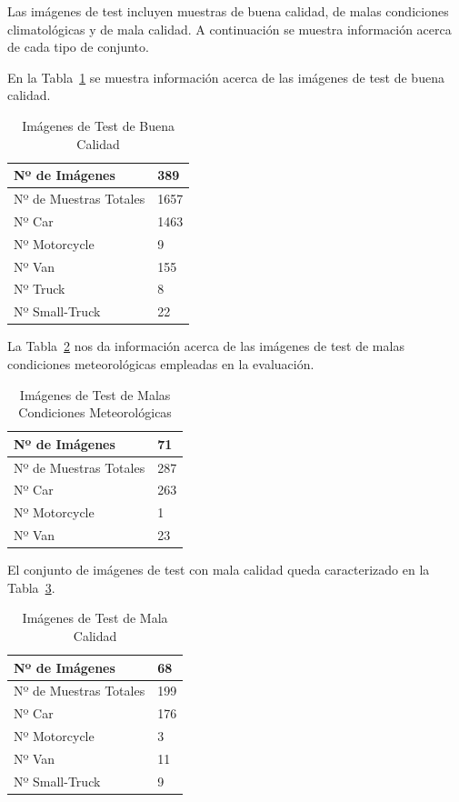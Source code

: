 Las imágenes de test incluyen muestras de buena calidad, de malas condiciones climatológicas y de mala calidad. A continuación se muestra información acerca de cada tipo de conjunto.

En la Tabla~\ref{tab_img_test_buenas} se muestra información acerca de las imágenes de test de buena calidad.
\begin{table}[H] 
\begin{center}
\begin{tabular}{|l|l|}
\hline
Nº de Imágenes  & 389 \\
\hline \hline
Nº de Muestras Totales & 1657\\ \hline
Nº Car & 1463 \\ \hline
Nº Motorcycle & 9 \\ \hline
Nº Van & 155 \\ \hline
Nº Truck & 8 \\ \hline
Nº Small-Truck & 22 \\ \hline
\end{tabular}
\caption{Imágenes de Test de Buena Calidad}
\label{tab_img_test_buenas}
\end{center}
\end{table}

La Tabla~\ref{tab_img_test_malas_condiciones} nos da información acerca de las imágenes de test de malas condiciones meteorológicas empleadas en la evaluación.
\begin{table}[H] 
\begin{center}
\begin{tabular}{|l|l|}
\hline
Nº de Imágenes  & 71 \\
\hline \hline
Nº de Muestras Totales & 287\\ \hline
Nº Car & 263 \\ \hline
Nº Motorcycle & 1 \\ \hline
Nº Van & 23 \\ \hline
\end{tabular}
\caption{Imágenes de Test de Malas Condiciones Meteorológicas}
\label{tab_img_test_malas_condiciones}
\end{center}
\end{table}

El conjunto de imágenes de test con mala calidad queda caracterizado en la Tabla~\ref{tab_img_test_mala_calidad}.

\begin{table}[H] 
\begin{center}
\begin{tabular}{|l|l|}
\hline
Nº de Imágenes  & 68 \\
\hline \hline
Nº de Muestras Totales & 199\\ \hline
Nº Car & 176 \\ \hline
Nº Motorcycle & 3 \\ \hline
Nº Van & 11 \\ \hline
Nº Small-Truck & 9 \\ \hline
\end{tabular}
\caption{Imágenes de Test de Mala Calidad}
\label{tab_img_test_mala_calidad}
\end{center}
\end{table}


